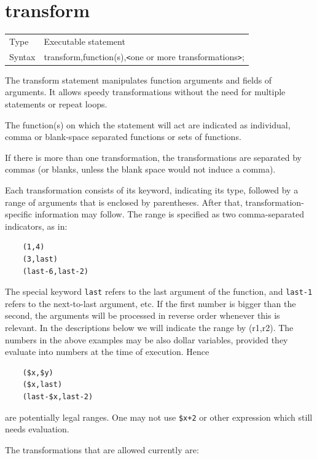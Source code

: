  
\section{transform}
\label{substatransform}

\noindent \begin{tabular}{ll}
Type & Executable statement\\
Syntax & transform,function(s),{\tt<}one or more transformations{\tt>};
\end{tabular} \vspace{4mm}

\noindent The transform statement manipulates function
arguments and 
fields of arguments. It allows speedy transformations without the need for 
multiple statements or repeat loops.

The function(s) on which the statement will act are indicated as individual,
comma or blank-space separated functions or sets of functions.

If there is more than one transformation, the transformations are separated 
by commas (or blanks, unless the blank space would not induce a comma).

Each transformation consists of its keyword, indicating its type, followed 
by a range of arguments that is enclosed by parentheses. After that, 
transformation-specific information may follow.
The range is specified as two comma-separated
indicators, as in:
\begin{verbatim}
	(1,4)
	(3,last)
	(last-6,last-2)
\end{verbatim}
The special keyword \verb:last: refers to the last argument of the
function, and \verb:last-1: refers to the next-to-last argument, etc.
If the first number is bigger 
than the second, the arguments will be processed in reverse order whenever 
this is relevant. In the descriptions below we will indicate the range by 
(r1,r2). The numbers in the above examples may be also dollar variables, 
provided they evaluate into numbers at the time of execution. Hence
\begin{verbatim}
	($x,$y)
	($x,last)
	(last-$x,last-2)
\end{verbatim}
are potentially legal ranges. One may not use \verb:$x+2: or other 
expression which still needs evaluation.

The transformations that are allowed currently are:
 
